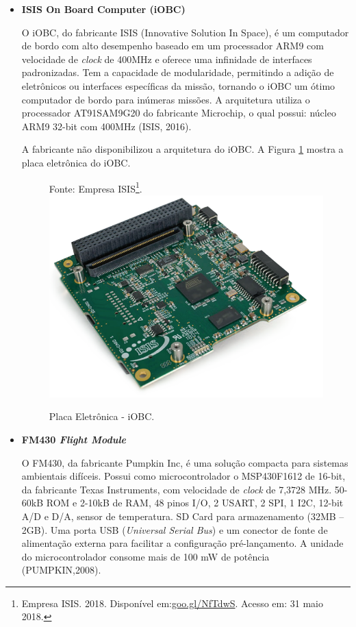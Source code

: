 \begin{itemize}
	\item \textbf{ISIS On Board Computer (iOBC)}
	
	O iOBC, do fabricante  ISIS (Innovative Solution In Space), é um computador de bordo com alto desempenho baseado em um processador ARM9 com velocidade de \textit{clock} de 400MHz e oferece uma infinidade de interfaces padronizadas. Tem a capacidade de modularidade, permitindo a adição de eletrônicos ou interfaces específicas da missão, tornando o iOBC um ótimo computador de bordo para inúmeras missões.	A arquitetura utiliza o processador AT91SAM9G20 do fabricante Microchip, o qual possui: núcleo ARM9 32-bit com 400MHz (ISIS, 2016).
	
	A fabricante não disponibilizou a arquitetura do iOBC. A Figura \ref{fig14} mostra a placa eletrônica do iOBC. 
	
	\begin{figure}[h]
		\centering
		Fonte: Empresa ISIS\footnote{Empresa ISIS. 2018. Disponível em:\url{goo.gl/NfTdwS}. Acesso em: 31 maio 2018.}. \linebreak
		\includegraphics[keepaspectratio=true,scale=0.44]{figuras/isis.PNG}
		\caption{Placa Eletrônica - iOBC.}
		\label{fig14}
	\end{figure}
	\FloatBarrier
	\newpage
	\item \textbf{FM430 \textit{Flight Module}}
	
	O FM430, da fabricante Pumpkin Inc, é uma solução compacta para sistemas ambientais difíceis. Possui como microcontrolador o MSP430F1612 de 16-bit, da fabricante Texas Instruments, com velocidade de \textit{clock} de 7,3728 MHz. 50-60kB ROM e 2-10kB de RAM, 48 pinos I/O, 2 USART, 2 SPI, 1 I2C, 12-bit A/D e D/A, sensor de temperatura. SD Card para armazenamento (32MB – 2GB). Uma porta USB (\textit{Universal Serial Bus}) e um conector de fonte de alimentação externa para facilitar a configuração pré-lançamento. A unidade do microcontrolador consome mais de 100 mW de potência (PUMPKIN,2008).
	

\end{itemize}
